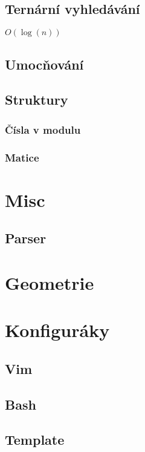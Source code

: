 \documentclass[10pt, a4paper]{article}
\begin{document}
\subsection{Ternární vyhledávání}
$O(\log(n))$


\subsection{Umocňování}


\subsection{Struktury}

\subsubsection{Čísla v modulu}


\subsubsection{Matice}


\newpage

\section{Misc}

\subsection{Parser}


\newpage

\section{Geometrie}


\newpage

\section{Konfiguráky}
\subsection{Vim}

\subsection{Bash}

\subsection{Template}

\end{document}
